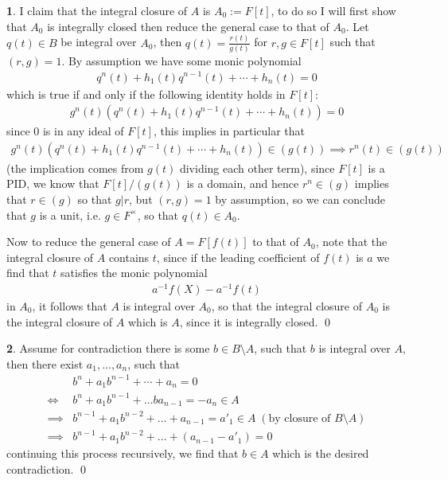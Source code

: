 \documentclass[11pt]{article}
\theoremstyle{definition}
\newtheorem{pb}{}
\begin{document}
    \begin{pb}
        I claim that the integral closure of \(A\) is \(A_0 := F[t]\), to do so I will first show that \(A_0\) is integrally closed then reduce the general case to that of \(A_0\). Let \(q(t) \in B\) be integral over \(A_0\), then \(q(t) = \frac{r(t)}{g(t)}\) for \(r,g \in F[t]\) such that \((r,g) = 1\). By assumption we have some monic polynomial
        \begin{align*}
            q^n(t) + h_1(t)q^{n-1}(t) + \cdots + h_n(t) = 0
        \end{align*}
        which is true if and only if the following identity holds in \(F[t]\):
        \begin{align*}
            g^n(t)(q^n(t) + h_1(t)q^{n-1}(t) + \cdots + h_n(t)) = 0
        \end{align*}
        since \(0\) is in any ideal of \(F[t]\), this implies in particular that
        \begin{align*}
            g^n(t)(q^n(t) + h_1(t)q^{n-1}(t) + \cdots + h_n(t)) \in (g(t)) \implies r^n(t) \in (g(t))
        \end{align*}
        (the implication comes from \(g(t)\) dividing each other term), since \(F[t]\) is a PID, we know that \(F[t]/(g(t))\) is a domain, and hence \(r^n \in (g)\) implies that \(r \in (g)\) so that \(g \vert r\), but \((r,g) = 1\) by assumption, so we can conclude that \(g\) is a unit, i.e. \(g \in F^\times\), so that \(q(t) \in A_0\). 
        
        Now to reduce the general case of \(A = F[f(t)]\) to that of \(A_0\), note that the integral closure of \(A\) contains \(t\), since if the leading coefficient of \(f(t)\) is \(a\) we find that \(t\) satisfies the monic polynomial
        \begin{align*}
            a^{-1}f(X) - a^{-1}f(t)
        \end{align*}
        in \(A_0\), it follows that \(A\) is integral over \(A_0\), so that the integral closure of \(A_0\) is the integral closure of \(A\) which is \(A\), since it is integrally closed. \qed
    \end{pb}
    \begin{pb}
        Assume for contradiction there is some \(b \in B \setminus A\), such that \(b\) is integral over \(A\), then there exist \(a_1,\hdots,a_n\), such that
        \begin{align*}
            &b^n + a_1 b^{n-1} + \cdots + a_n = 0 \\
            \iff &b^n + a_1b^{n-1} + \hdots ba_{n-1} = -a_n \in A \\
            \implies &b^{n-1} + a_1b^{n-2} + \hdots + a_{n-1} = a'_1 \in A \;(\text{by closure of }B\setminus A)\\
            \implies &b^{n-1} + a_1b^{n-2} + \hdots + (a_{n-1} - a'_1) = 0
        \end{align*}
        continuing this process recursively, we find that \(b \in A\) which is the desired contradiction. \qed
    \end{pb}
\end{document}
